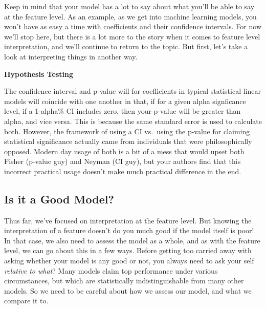 \documentclass[
  letterpaper,
]{krantz}
\begin{document}
Keep in mind that your model has a lot to say about what you'll be able
to say at the feature level. As an example, as we get into machine
learning models, you won't have as easy a time with coefficients and
their confidence intervals. For now we'll stop here, but there is a lot
more to the story when it comes to feature level interpretation, and
we'll continue to return to the topic. But first, let's take a look at
interpreting things in another way.

\begin{tcolorbox}[enhanced jigsaw, opacityback=0, leftrule=.75mm, bottomrule=.15mm, colframe=quarto-callout-tip-color-frame, rightrule=.15mm, breakable, left=2mm, colback=white, arc=.35mm, toprule=.15mm]

\vspace{-3mm}\textbf{Hypothesis Testing}\vspace{3mm}

The confidence interval and p-value will for coefficients in typical
statistical linear models will coincide with one another in that, if for
a given alpha signficance level, if a 1-alpha\% CI includes zero, then
your p-value will be greater than alpha, and vice versa. This is because
the same standard error is used to calculate both. However, the
framework of using a CI vs.~using the p-value for claiming statistical
significance actually came from individuals that were philosophically
opposed. Modern day usage of both is a bit of a mess that would upset
both Fisher (p-value guy) and Neyman (CI guy), but your authors find
that this incorrect practical usage doesn't make much practical
difference in the end.

\end{tcolorbox}

\subsection{Is it a Good Model?}\label{sec-lm-interpretation-model}

Thus far, we've focused on interpretation at the feature level. But
knowing the interpretation of a feature doesn't do you much good if the
model itself is poor! In that case, we also need to assess the model as
a whole, and as with the feature level, we can go about this in a few
ways. Before getting too carried away with asking whether your model is
any good or not, you always need to ask your self \emph{relative to
what}? Many models claim top performance under various circumstances,
but which are statistically indistinguishable from many other models. So
we need to be careful about how we assess our model, and what we compare
it to.
\end{document}
